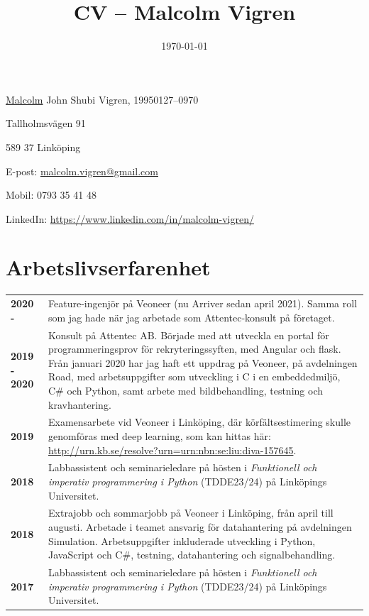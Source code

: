 \documentclass[a4paper,notitlepage]{article}
\title{
\huge{CV -- Malcolm Vigren}\vspace{-3ex}}
\date{\today}
\makeatletter
\newcommand{\at}{@}
\makeatother
\begin{document}
	\maketitle
\underline{Malcolm} John Shubi Vigren, 19950127--0970

Tallholmsvägen 91

589 37 Linköping

E-post: \underline{malcolm.vigren\at{}gmail.com}

Mobil: 0793 35 41 48

LinkedIn: \url{https://www.linkedin.com/in/malcolm-vigren/}

\section*{Arbetslivserfarenhet}
\begin{longtable}{@{}l p{13cm}}
\textbf{2020 - } & Feature-ingenjör på Veoneer (nu Arriver sedan april 2021).
    Samma roll som jag hade
    när jag arbetade som Attentec-konsult på företaget. \\

\textbf{2019 - 2020} & Konsult på Attentec AB. Började med att utveckla en portal
    för programmeringsprov för rekryteringssyften, med Angular och
    flask. Från januari 2020 har jag haft ett uppdrag på Veoneer, på
    avdelningen Road, med arbetsuppgifter som utveckling i C i en embeddedmiljö, C\#
    och Python, samt arbete med bildbehandling, testning och kravhantering. \\

\textbf{2019} & Examensarbete vid Veoneer i Linköping, där
    körfältsestimering skulle genomföras med deep learning, som kan hittas här:
    \url{http://urn.kb.se/resolve?urn=urn:nbn:se:liu:diva-157645}. \\

\textbf{2018} & Labbassistent och seminarieledare på hösten i \textit{Funktionell och
    imperativ programmering i Python} (TDDE23/24) på Linköpings
    Universitet. \\

\textbf{2018} & Extrajobb och sommarjobb på Veoneer i Linköping, från april till augusti.
    Arbetade i teamet ansvarig för datahantering på avdelningen
    Simulation. Arbetsuppgifter inkluderade utveckling i Python, JavaScript och
    C\#, testning, datahantering och signalbehandling. \\

\textbf{2017} & Labbassistent och seminarieledare på hösten i \textit{Funktionell och
    imperativ programmering i Python} (TDDE23/24) på Linköpings
    Universitet. \\


\end{longtable}
\end{document}
